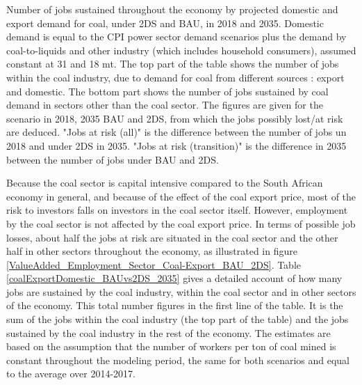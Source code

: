 \documentclass[12pt,english]{article}
\begin{document}
\begin{table}[!t]
	\caption{\label{coalExportDomestic_BAUvs2DS_2035}Number of jobs sustained throughout the economy by projected domestic and export demand for coal, under 2DS and BAU, in 2018 and 2035. Domestic demand is equal to the CPI power sector demand scenarios plus the demand by coal-to-liquids and other industry (which includes household consumers), assumed constant at 31 and 18 mt. The top part of the table shows the number of jobs within the coal industry, due to demand for coal from different sources : export and domestic. The bottom part shows the number of jobs sustained by coal demand in sectors other than the coal sector. The figures are given for the scenario in 2018, 2035 BAU and 2DS, from which the jobs possibly lost/at risk are deduced. "Jobs at risk (all)" is the difference between the number of jobs un 2018 and under 2DS in 2035. "Jobs at risk (transition)" is the difference in 2035 between the number of jobs under BAU and 2DS.}
\end{table}

Because the coal sector is capital intensive compared to the South African economy in general, and because of the effect of the coal export price, most of the risk to investors falls on investors in the coal sector itself. However, employment by the coal sector is not affected by the coal export price. In terms of possible job losses, about half the jobs at risk are situated in the coal sector and the other half in other sectors throughout the economy, as illustrated in figure \ref{ValueAdded_Employment_Sector_Coal-Export_BAU_2DS}. Table \ref{coalExportDomestic_BAUvs2DS_2035} gives a detailed account of how many jobs are sustained by the coal industry, within the coal sector and in other sectors of the economy. This total number figures in the first line of the table. It is the sum of the jobs within the coal industry (the top part of the table) and the jobs sustained by the coal industry in the rest of the economy. The estimates are based on the assumption that the number of workers per ton of coal mined is constant throughout the modeling period, the same for both scenarios and equal to the average over 2014-2017.
\end{document}
